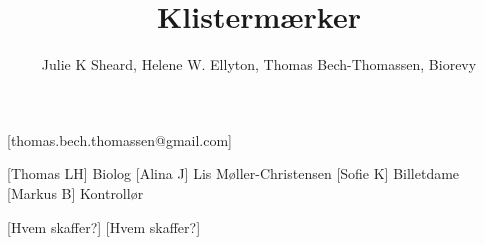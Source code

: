 \documentclass[a4paper,12pt]{article}
\title{Klistermærker}
\author{Julie K Sheard, Helene W. Ellyton, Thomas Bech-Thomassen, Biorevy}
\begin{document}
\maketitle

\begin{texxers}
	[thomas.bech.thomassen@gmail.com]
\end{texxers}

\begin{roles}
	[Thomas LH] Biolog
	[Alina J] Lis Møller-Christensen
	[Sofie K] Billetdame
	[Markus B] Kontrollør
\end{roles}


\begin{props}
	[Hvem skaffer?] 
	[Hvem skaffer?]
\end{props}
\end{document}
